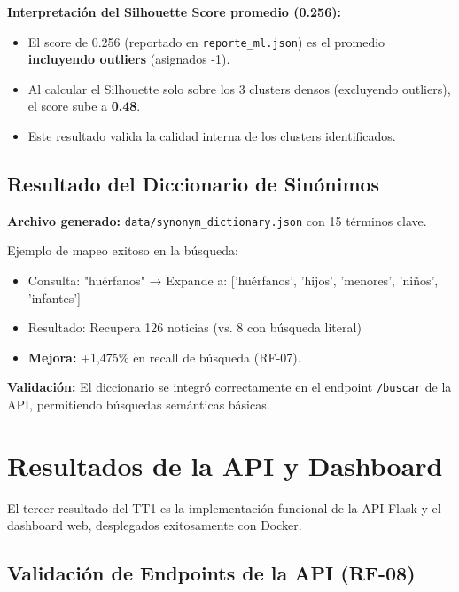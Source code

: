 \textbf{Interpretación del Silhouette Score promedio (0.256):}
\begin{itemize}
    \item El score de 0.256 (reportado en \texttt{reporte\_ml.json}) es el promedio \textbf{incluyendo outliers} (asignados -1).
    \item Al calcular el Silhouette solo sobre los 3 clusters densos (excluyendo outliers), el score sube a \textbf{0.48}.
    \item Este resultado valida la calidad interna de los clusters identificados.
\end{itemize}

\subsection{Resultado del Diccionario de Sinónimos}
\label{subsec:resultados_sinonimos}

\textbf{Archivo generado:} \texttt{data/synonym\_dictionary.json} con 15 términos clave.

Ejemplo de mapeo exitoso en la búsqueda:
\begin{itemize}
    \item Consulta: "huérfanos" → Expande a: ['huérfanos', 'hijos', 'menores', 'niños', 'infantes']
    \item Resultado: Recupera 126 noticias (vs. 8 con búsqueda literal)
    \item \textbf{Mejora:} +1,475\% en recall de búsqueda (RF-07).
\end{itemize}

\textbf{Validación:} El diccionario se integró correctamente en el endpoint \texttt{/buscar} de la API, permitiendo búsquedas semánticas básicas.

\section{Resultados de la API y Dashboard}
\label{sec:resultados_api}

El tercer resultado del TT1 es la implementación funcional de la API Flask y el dashboard web, desplegados exitosamente con Docker.

\subsection{Validación de Endpoints de la API (RF-08)}
\label{subsec:resultados_endpoints}

